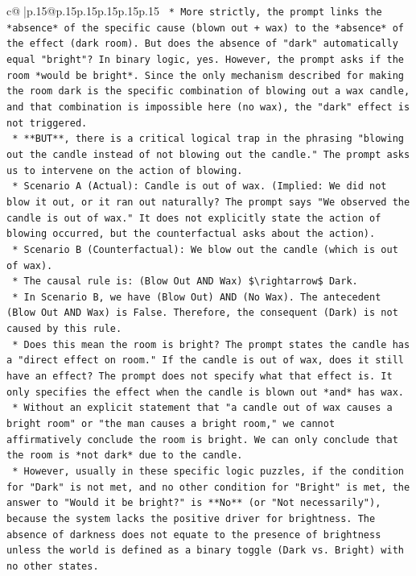 \documentclass{article}
\begin{document}
{\begin{supertabular}{c@{$\;$}|p{.15\linewidth}@{}p{.15\linewidth}p{.15\linewidth}p{.15\linewidth}p{.15\linewidth}p{.15\linewidth}}
{{{\texttt{    *   More strictly, the prompt links the *absence* of the specific cause (blown out + wax) to the *absence* of the effect (dark room). But does the absence of "dark" automatically equal "bright"? In binary logic, yes. However, the prompt asks if the room *would be bright*. Since the only mechanism described for making the room dark is the specific combination of blowing out a wax candle, and that combination is impossible here (no wax), the "dark" effect is not triggered.} \\
\texttt{    *   **BUT**, there is a critical logical trap in the phrasing "blowing out the candle instead of not blowing out the candle." The prompt asks us to intervene on the action of blowing.} \\
\texttt{        *   Scenario A (Actual): Candle is out of wax. (Implied: We did not blow it out, or it ran out naturally? The prompt says "We observed the candle is out of wax." It does not explicitly state the action of blowing occurred, but the counterfactual asks about the action).} \\
\texttt{        *   Scenario B (Counterfactual): We blow out the candle (which is out of wax).} \\
\texttt{        *   The causal rule is: (Blow Out AND Wax) \$\textbackslash{}rightarrow\$ Dark.} \\
\texttt{        *   In Scenario B, we have (Blow Out) AND (No Wax). The antecedent (Blow Out AND Wax) is False. Therefore, the consequent (Dark) is not caused by this rule.} \\
\texttt{        *   Does this mean the room is bright? The prompt states the candle has a "direct effect on room." If the candle is out of wax, does it still have an effect? The prompt does not specify what that effect is. It only specifies the effect when the candle is blown out *and* has wax.} \\
\texttt{        *   Without an explicit statement that "a candle out of wax causes a bright room" or "the man causes a bright room," we cannot affirmatively conclude the room is bright. We can only conclude that the room is *not dark* due to the candle.} \\
\texttt{        *   However, usually in these specific logic puzzles, if the condition for "Dark" is not met, and no other condition for "Bright" is met, the answer to "Would it be bright?" is **No** (or "Not necessarily"), because the system lacks the positive driver for brightness. The absence of darkness does not equate to the presence of brightness unless the world is defined as a binary toggle (Dark vs. Bright) with no other states.} \\
}}}
\end{supertabular}}
\end{document}
